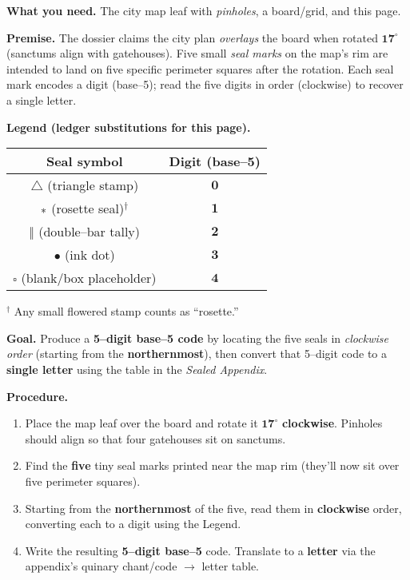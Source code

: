 \documentclass[11pt]{article}
\begin{document}
\begin{itemize}
\noindent\textbf{What you need.} The city map leaf with \emph{pinholes}, a board/grid, and this page.

\medskip
\noindent\textbf{Premise.} The dossier claims the city plan \emph{overlays} the board when rotated \(\mathbf{17^\circ}\) (sanctums align with gatehouses). Five small \emph{seal marks} on the map’s rim are intended to land on five specific perimeter squares after the rotation. Each seal mark encodes a digit (base–5); read the five digits in order (clockwise) to recover a single letter.

\medskip
\noindent\textbf{Legend (ledger substitutions for this page).}
\begin{center}
\begin{tabular}{c|c}
\textbf{Seal symbol} & \textbf{Digit (base–5)} \\
\hline
\(\triangle\) (triangle stamp) & \(\mathbf{0}\) \\
\(\large\ast\) (rosette seal)\(^\dagger\) & \(\mathbf{1}\) \\
\(\Vert\) (double–bar tally) & \(\mathbf{2}\) \\
\(\bullet\) (ink dot) & \(\mathbf{3}\) \\
\(\square\) (blank/box placeholder) & \(\mathbf{4}\) \\
\end{tabular}
\end{center}
\noindent\(^\dagger\) Any small flowered stamp counts as “rosette.”

\medskip
\noindent\textbf{Goal.} Produce a \textbf{5–digit base–5 code} by locating the five seals in \emph{clockwise order} (starting from the \textbf{northernmost}), then convert that 5–digit code to a \textbf{single letter} using the table in the \emph{Sealed Appendix}.

\medskip
\noindent\textbf{Procedure.}
\begin{enumerate}\setlength\itemsep{0.2em}
  \item Place the map leaf over the board and rotate it \(\mathbf{17^\circ}\) \textbf{clockwise}. Pinholes should align so that four gatehouses sit on sanctums.
  \item Find the \textbf{five} tiny seal marks printed near the map rim (they’ll now sit over five perimeter squares).
  \item Starting from the \textbf{northernmost} of the five, read them in \textbf{clockwise} order, converting each to a digit using the Legend.
  \item Write the resulting \textbf{5–digit base–5} code. Translate to a \textbf{letter} via the appendix’s quinary chant/code \(\rightarrow\) letter table.
\end{enumerate}


\end{itemize}
\end{document}

